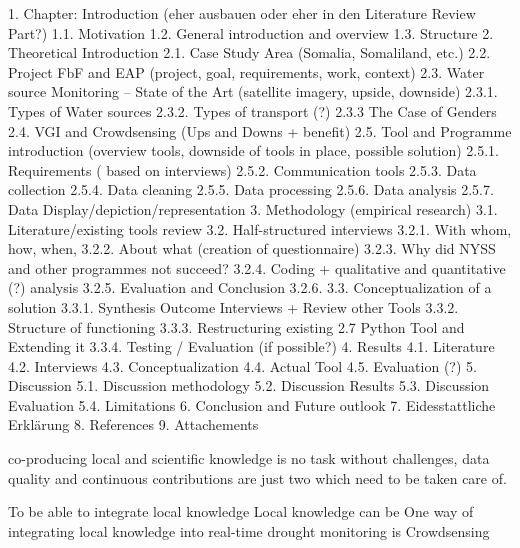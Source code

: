 1.  Chapter: Introduction (eher ausbauen oder eher in den Literature Review Part?)
    1.1. Motivation
    1.2. General introduction and overview
    1.3. Structure
2.  Theoretical Introduction
    2.1. Case Study Area (Somalia, Somaliland, etc.)
    2.2. Project FbF and EAP (project, goal, requirements, work, context)
    2.3. Water source Monitoring – State of the Art (satellite imagery, upside, downside)
    	2.3.1. Types of Water sources
    	2.3.2. Types of transport (?)
    	2.3.3 The Case of Genders
	2.4. VGI and Crowdsensing (Ups and Downs + benefit)
    2.5. Tool and Programme introduction (overview tools, downside of tools in place, possible solution)
    2.5.1. Requirements ( based on interviews)
    2.5.2. Communication tools
    2.5.3. Data collection
    2.5.4. Data cleaning
    2.5.5. Data processing
    2.5.6. Data analysis
    2.5.7. Data Display/depiction/representation
3.  Methodology (empirical research)
    3.1. Literature/existing tools review
    3.2. Half-structured interviews
    3.2.1. With whom, how, when,
    3.2.2. About what (creation of questionnaire)
    3.2.3. Why did NYSS and other programmes not succeed?
    3.2.4. Coding + qualitative and quantitative (?) analysis
    3.2.5. Evaluation and Conclusion
    3.2.6.
    3.3. Conceptualization of a solution
    3.3.1. Synthesis Outcome Interviews + Review other Tools
    3.3.2. Structure of functioning
    3.3.3. Restructuring existing 2.7 Python Tool and Extending it
    3.3.4. Testing / Evaluation (if possible?)
4.  Results
    4.1. Literature
    4.2. Interviews
    4.3. Conceptualization
    4.4. Actual Tool
    4.5. Evaluation (?)
5.  Discussion
    5.1. Discussion methodology
    5.2. Discussion Results
    5.3. Discussion Evaluation
    5.4. Limitations
6.  Conclusion and Future outlook
7.  Eidesstattliche Erklärung
8.  References
9.  Attachements


















co-producing local and scientific knowledge is no task without challenges, data quality and continuous contributions are just two which need to be taken care of. 

To be able to integrate local knowledge
Local knowledge can be 
One way of integrating local knowledge into real-time drought monitoring is Crowdsensing


